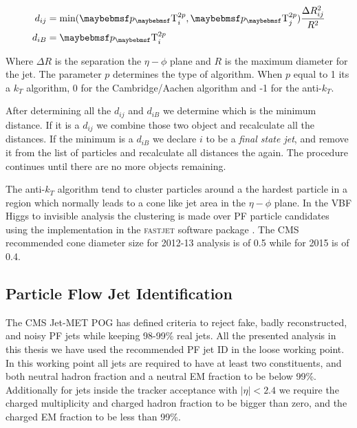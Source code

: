 \begin{align}
d_{ij} &= \text{min}({\pT}_{i}^{2p},{\pT}_{j}^{2p})\frac{\Delta R_{ij}^{2}}{R^{2}} \label{EQUATION:EventReconstructionAndSimulation_AKDistances1} \\
d_{iB} &= {\pT}_{i}^{2p}\ \label{EQUATION:EventReconstructionAndSimulation_AKDistances2} 
\end{align}

Where $\Delta R$ is the separation the $\eta-\phi$ plane and $R$ is the maximum diameter for the jet. The parameter $p$ determines the type of algorithm. When $p$ equal to 1 its a $k_T$ algorithm, 0 for the Cambridge/Aachen algorithm and -1 for the anti-$k_T$. 

After determining all the $d_{ij}$ and $d_{iB}$ we determine which is the minimum distance. If it is a $d_{ij}$ we combine those two object and recalculate all the distances. If the minimum is a $d_{iB}$ we declare $i$ to be a \textit{final state jet}, and remove it from the list of particles and recalculate all distances the again. The procedure continues until there are no more objects remaining.

The anti-$k_T$ algorithm tend to cluster particles around a the hardest particle in a region which normally leads to a cone like jet area in the $\eta-\phi$ plane. In the \gls{VBF} Higgs to invisible analysis the clustering is made over \gls{PF} particle candidates using the implementation in the \textsc{fastjet} software package \cite{ARTICLE:FastJetUserManual}. The \gls{CMS} recommended cone diameter size for 2012-13 analysis is of 0.5 while for 2015 is of 0.4.


\subsection{Particle Flow Jet Identification} 
\label{SECTION:EventReconstructionAndSimulation_Jets_ParticleFlowJetID}



The \gls{CMS} Jet-MET \gls{POG} has defined criteria to reject fake, badly reconstructed, and noisy \gls{PF} jets while keeping 98-99\% real jets. All the presented analysis in this thesis we have used the recommended \gls{PF} jet \gls{ID} in the loose working point. In this working point all jets are required to have at least two constituents, and both neutral hadron fraction and a neutral \gls{EM} fraction to be below 99\%. Additionally for jets inside the tracker acceptance with $|\eta| < 2.4$ we require the charged multiplicity and charged hadron fraction to be bigger than zero, and the charged \gls{EM} fraction to be less than 99\%.


